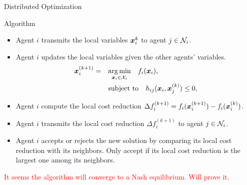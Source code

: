 \documentclass[9pt]{beamer}
\begin{document}


\begin{frame}{Distributed Optimization}

\begin{block}{Algorithm}
\begin{itemize}
\item Agent $i$ transmits the local variables $\boldsymbol{x}_i^{k}$ to agent $j \in \mathcal{N}_i$.

\item Agent $i$ updates the local variables given the other agents' variables.
\begin{equation*}
\begin{split}
\boldsymbol{x}_i^{(k+1)} = \quad
& \underset{\boldsymbol{x}_i \in \mathcal{X}_i}{\operatorname*{arg\,min}} \quad f_i (\boldsymbol{x}_i), \\
& \text{subject to} \quad h_{ij} (\boldsymbol{x}_i, \boldsymbol{x}_j^{(k)}) \le 0,
\end{split}
\end{equation*}

\item Agent $i$ compute the local cost reduction $\Delta f_i^{(k+1)} = f_i(\boldsymbol{x}_i^{(k+1)}) - f_i(\boldsymbol{x}_i^{(k)})$.

\item Agent $i$ transmits the local cost reduction $\Delta f_i^{(k+1)}$ to agent $j \in \mathcal{N}_i$.

\item Agent $i$ accepts or rejects the new solution by comparing its local cost reduction with its neighbors. Only accept if its local cost reduction is the largest one among its neighbors. 

\end{itemize}
\end{block}

\textcolor{red}{It seems the algorithm will converge to a Nash equilibrium. Will prove it.}

\end{frame}
\end{document}
